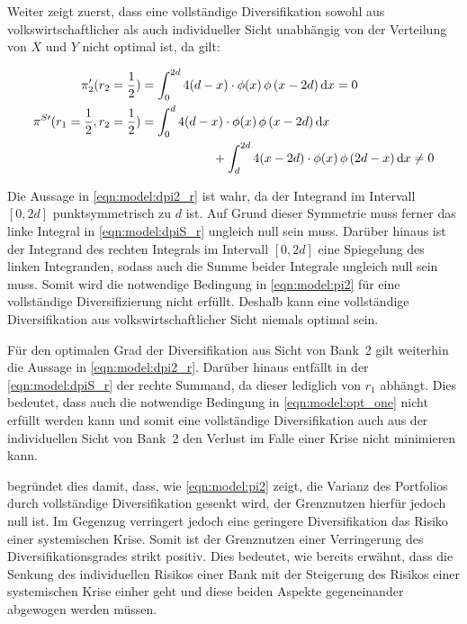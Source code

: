 Weiter zeigt \citeauthor{Wagner-2010} zuerst, dass eine vollständige Diversifikation sowohl aus volkswirtschaftlicher als auch individueller Sicht unabhängig von der Verteilung von $X$ und $Y$ nicht optimal ist, da gilt:

\begin{align}
	\pi'_2(r_2=\frac{1}{2})                        & = \int_0^{2d} 4(d-x) \cdot \phi(x)\,\phi\left(x-2d\right) \dd x = 0 	              \label{eqn:model:dpi2_r}    \\
	\pi^{S\prime}(r_1=\frac{1}{2},r_2=\frac{1}{2}) & = \int_0^{d} 4(d-x) \cdot \phi(x)\,\phi\left(x-2d\right) \dd x \notag                                         \\
	                                               & \hspace{2cm} + \int_d^{2d} 4(x-2d) \cdot \phi(x)\,\phi\left(2d-x\right) \dd x \neq 0 \label{eqn:model:dpiS_r}
\end{align}

Die Aussage in \cref{eqn:model:dpi2_r} ist wahr, da der Integrand im Intervall $[0,2d]$ punktsymmetrisch zu $d$ ist. Auf Grund dieser Symmetrie muss ferner das linke Integral in \cref{eqn:model:dpiS_r} ungleich null sein muss. Darüber hinaus ist der Integrand des rechten Integrals im Intervall $[0,2d]$ eine Spiegelung des linken Integranden, sodass auch die Summe beider Integrale ungleich null sein muss. Somit wird die notwendige Bedingung in \cref{eqn:model:pi2} für eine vollständige Diversifizierung nicht erfüllt. Deshalb kann eine vollständige Diversifikation aus volkswirtschaftlicher Sicht niemals optimal sein.

Für den optimalen Grad der Diversifikation aus Sicht von Bank~2 gilt weiterhin die Aussage in \cref{eqn:model:dpi2_r}. Darüber hinaus entfällt in der \cref{eqn:model:dpiS_r} der rechte Summand, da dieser lediglich von $r_1$ abhängt. Dies bedeutet, dass auch die notwendige Bedingung in \cref{eqn:model:opt_one} nicht erfüllt werden kann und somit eine vollständige Diversifikation auch aus der individuellen Sicht von Bank~2 den Verlust im Falle einer Krise nicht minimieren kann.

 begründet dies damit, dass, wie \cref{eqn:model:pi2} zeigt, die Varianz des Portfolios durch vollständige Diversifikation gesenkt wird, der Grenznutzen hierfür jedoch null ist. Im Gegenzug verringert jedoch eine geringere Diversifikation das Risiko einer systemischen Krise. Somit ist der Grenznutzen einer Verringerung des Diversifikationsgrades strikt positiv. Dies bedeutet, wie bereits erwähnt, dass die Senkung des individuellen Risikos einer Bank mit der Steigerung des Risikos einer systemischen Krise einher geht und diese beiden Aspekte gegeneinander abgewogen werden müssen.

